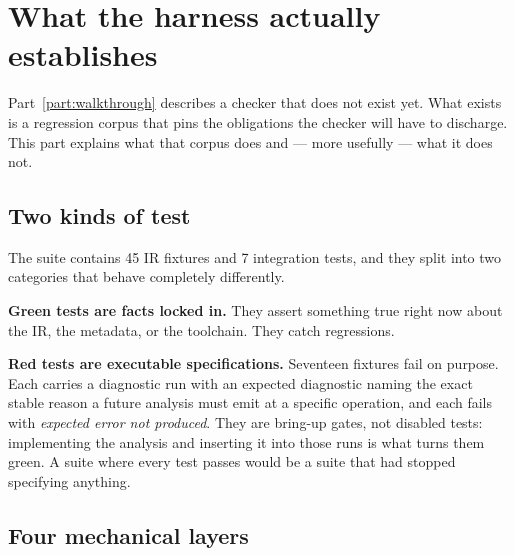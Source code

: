 \section{What the harness actually establishes}
\label{part:harness}

Part~\ref{part:walkthrough} describes a checker that does not exist yet. What
exists is a regression corpus that pins the obligations the checker will have to
discharge. This part explains what that corpus does and --- more usefully --- what
it does not.

\subsection{Two kinds of test}

The suite contains 45 IR fixtures and 7 integration tests, and they split into
two categories that behave completely differently.

\textbf{Green tests are facts locked in.} They assert something true right now
about the IR, the metadata, or the toolchain. They catch regressions.

\textbf{Red tests are executable specifications.} Seventeen fixtures fail on
purpose. Each carries a diagnostic run with an expected diagnostic naming the
exact stable reason a future analysis must emit at a specific operation, and each
fails with \emph{expected error not produced}. They are bring-up gates, not
disabled tests: implementing the analysis and inserting it into those runs is
what turns them green. A suite where every test passes would be a suite that had
stopped specifying anything.

\subsection{Four mechanical layers}

